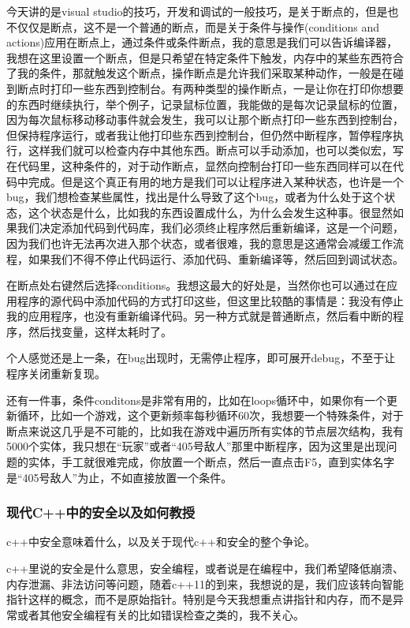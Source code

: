今天讲的是visual studio的技巧，开发和调试的一般技巧，是关于断点的，但是也不仅仅是断点，这不是一个普通的断点，而是关于条件与操作(conditions and actions)应用在断点上，通过条件或条件断点，我的意思是我们可以告诉编译器，我想在这里设置一个断点，但是只希望在特定条件下触发，内存中的某些东西符合了我的条件，那就触发这个断点，操作断点是允许我们采取某种动作，一般是在碰到断点时打印一些东西到控制台。有两种类型的操作断点，一是让你在打印你想要的东西时继续执行，举个例子，记录鼠标位置，我能做的是每次记录鼠标的位置，因为每次鼠标移动移动事件就会发生，我可以让那个断点打印一些东西到控制台，但保持程序运行，或者我让他打印些东西到控制台，但仍然中断程序，暂停程序执行，这样我们就可以检查内存中其他东西。断点可以手动添加，也可以类似宏，写在代码里，这种条件的，对于动作断点，显然向控制台打印一些东西同样可以在代码中完成。但是这个真正有用的地方是我们可以让程序进入某种状态，也许是一个bug，我们想检查某些属性，找出是什么导致了这个bug，或者为什么处于这个状态，这个状态是什么，比如我的东西设置成什么，为什么会发生这种事。很显然如果我们决定添加代码到代码库，我们必须终止程序然后重新编译，这是一个问题，因为我们也许无法再次进入那个状态，或者很难，我的意思是这通常会减缓工作流程，如果我们不得不停止代码运行、添加代码、重新编译等，然后回到调试状态。

在断点处右键然后选择conditions。我想这最大的好处是，当然你也可以通过在应用程序的源代码中添加代码的方式打印这些，但这里比较酷的事情是：我没有停止我的应用程序，也没有重新编译代码。另一种方式就是普通断点，然后看中断的程序，然后找变量，这样太耗时了。

个人感觉还是上一条，在bug出现时，无需停止程序，即可展开debug，不至于让程序关闭重新复现。

还有一件事，条件{\ncodestyle conditons}是非常有用的，比如在loops循环中，如果你有一个更新循环，比如一个游戏，这个更新频率每秒循环60次，我想要一个特殊条件，对于断点来说这几乎是不可能的，比如我在游戏中遍历所有实体的节点层次结构，我有5000个实体，我只想在“玩家”或者“405号敌人”那里中断程序，因为这里是出现问题的实体，手工就很难完成，你放置一个断点，然后一直点击F5，直到实体名字是“405号敌人”为止，不如直接放置一个条件。


\subsubsection{现代C++中的安全以及如何教授}

c++中安全意味着什么，以及关于现代c++和安全的整个争论。

c++里说的安全是什么意思，安全编程，或者说是在编程中，我们希望降低崩溃、内存泄漏、非法访问等问题，随着c++11的到来，我想说的是，我们应该转向智能指针这样的概念，而不是原始指针。特别是今天我想重点讲指针和内存，而不是异常或者其他安全编程有关的比如错误检查之类的，我不关心。

